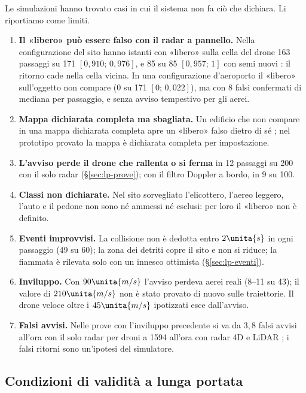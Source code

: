 Le simulazioni hanno trovato casi in cui il sistema non fa ciò che dichiara. Li riportiamo come limiti.
\begin{enumerate}[label=\arabic*.]
\item \textbf{Il «libero» può essere falso con il radar a pannello.} %
Nella configurazione del sito hanno istanti con «libero» sulla cella del drone 163 passaggi su 171 $[0{,}910;\,0{,}976]$, e 85 su 85 $[0{,}957;\,1]$ con semi nuovi : il ritorno cade nella cella vicina. In una configurazione d'aeroporto il «libero» sull'oggetto non compare (0 su 171 $[0;\,0{,}022]$), ma con 8 falsi confermati di mediana per passaggio, e senza avviso tempestivo per gli aerei.
\item \textbf{Mappa dichiarata completa ma sbagliata.} Un edificio che non compare in una mappa dichiarata completa apre un «libero» falso dietro di sé ; nel prototipo provato la mappa è dichiarata completa per impostazione.
\item \textbf{L'avviso perde il drone che rallenta o si ferma} in 12 passaggi su 200 con il solo radar (\S\ref{sec:lp-prove}); con il filtro Doppler a bordo, in 9 su 100.
\item \textbf{Classi non dichiarate.} Nel sito sorvegliato l'elicottero, l'aereo leggero, l'auto e il pedone non sono né ammessi né esclusi: per loro il «libero» non è definito.
\item \textbf{Eventi improvvisi.} La collisione non è dedotta entro $2\unita{s}$ in ogni passaggio (49 su 60); la zona dei detriti copre il sito e non si riduce; la fiammata è rilevata solo con un innesco ottimista (\S\ref{sec:lp-eventi}).
\item \textbf{Inviluppo.} Con $90\unita{m/s}$ l'avviso perdeva aerei reali (8--11 su 43); il valore di $210\unita{m/s}$ non è stato provato di nuovo sulle traiettorie. Il drone veloce oltre i $45\unita{m/s}$ ipotizzati esce dall'avviso.
\item \textbf{Falsi avvisi.} Nelle prove con l'inviluppo precedente si va da $3{,}8$ falsi avvisi all'ora con il solo radar per droni a 1594 all'ora con radar 4D e LiDAR ; i falsi ritorni sono un'ipotesi del simulatore.
\end{enumerate}

\subsection{Condizioni di validità a lunga portata}\label{sec:lp-validita}

